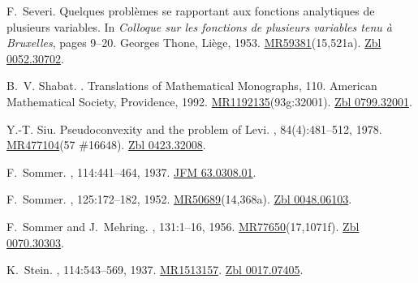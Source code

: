 \documentclass[11pt,a4paper, final, twoside]{article}
\numberwithin{equation}{section}
\begin{document}
\begin{appendices}
\begin{thebibliography}{100}
F.~Severi.
\newblock Quelques probl\`emes se rapportant aux fonctions analytiques de
  plusieurs variables.
\newblock In {\em Colloque sur les fonctions de plusieurs variables tenu \`a
  {B}ruxelles}, pages 9--20. Georges Thone, Li\`ege, 1953.
\newblock
  \href{http://www.ams.org/mathscinet-getitem?mr=59381}{MR59381}(15,521a).
  \href{http://zbmath.org/?q=an:0052.30702}{Zbl 0052.30702}.

B.~V. Shabat.
.
\newblock Translations of Mathematical Monographs, 110. American Mathematical
  Society, Providence, 1992.
\newblock
  \href{http://www.ams.org/mathscinet-getitem?mr=1192135}{MR1192135}(93g:32001).
  \href{http://zbmath.org/?q=an:0799.32001}{Zbl 0799.32001}.

Y.-T. Siu.
\newblock Pseudoconvexity and the problem of {L}evi.
, 84(4):481--512,
  1978.
\newblock \href{http://www.ams.org/mathscinet-getitem?mr=477104}{MR477104}(57
  \#16648). \href{http://zbmath.org/?q=an:0423.32008}{Zbl 0423.32008}.

F.~Sommer.
, 114:441--464, 1937.
\newblock \href{http://zbmath.org/?q=an:63.0308.01}{JFM 63.0308.01}.

F.~Sommer.
, 125:172--182, 1952.
\newblock
  \href{http://www.ams.org/mathscinet-getitem?mr=50689}{MR50689}(14,368a).
  \href{http://zbmath.org/?q=an:0048.06103}{Zbl 0048.06103}.

F.~Sommer and J.~Mehring.
, 131:1--16, 1956.
\newblock
  \href{http://www.ams.org/mathscinet-getitem?mr=77650}{MR77650}(17,1071f).
  \href{http://zbmath.org/?q=an:0070.30303}{Zbl 0070.30303}.

K.~Stein.
, 114:543--569, 1937.
\newblock \href{http://www.ams.org/mathscinet-getitem?mr=1513157}{MR1513157}.
  \href{http://zbmath.org/?q=an:0017.07405}{Zbl 0017.07405}.


\end{thebibliography}
\end{appendices}
\end{document}
